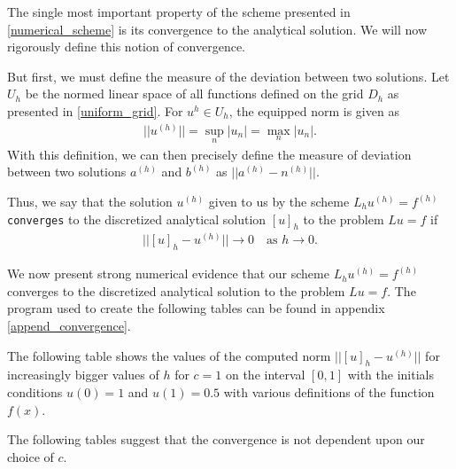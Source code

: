 The single most important property of the scheme presented in
\eqref{numerical_scheme} is its convergence to the analytical solution. We will
now rigorously define this notion of convergence.

But first, we must define the measure of the deviation between two solutions.
Let $U_h$ be the normed linear space of all functions defined on the grid $D_h$
as presented in \eqref{uniform_grid}. For $u^{h} \in U_h$, the equipped norm is
given as
\begin{align}\label{norm}
  ||u^{(h)}|| = \sup_n |u_n| = \max_n |u_n|.
\end{align}
With this definition, we can then precisely define the measure of deviation
between two solutions $a^{(h)}$ and $b^{(h)}$ as $||a^{(h)} - n^{(h)}||$.

Thus, we say that the solution $u^{(h)}$ given to us by the
scheme $L_h u^{(h)} = f^{(h)}$ \texttt{converges} to the discretized analytical
solution $[u]_h$ to the problem $Lu = f$ if
\begin{align}\label{convergence_def}
  ||[u]_h - u^{(h)}|| \to 0 \quad \text{as $h \to 0$}.
\end{align}

We now present strong numerical evidence that our scheme $L_h u^{(h)} = f^{(h)}$
converges to the discretized analytical solution to the problem $Lu = f$. The
program used to create the following tables can be found in appendix \ref{append_convergence}.

The following table shows the values of the computed norm $||[u]_h - u^{(h)}||$ for
increasingly bigger values of $h$ for $c=1$ on the interval $[0, 1]$ with the
initials conditions $u(0) = 1$ and $u(1) = 0.5$ with various definitions of
the function $f(x)$.

The following tables suggest that the convergence is not dependent upon our
choice of $c$.
